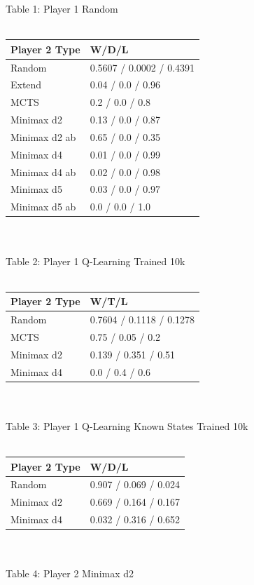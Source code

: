 \documentclass[12pt]{article}
\begin{document}
Table 1: Player 1 Random\\\\
\begin{tabular}{l | l}
Player 2 Type & W/D/L                    \\ \hline
Random        & 0.5607 / 0.0002 / 0.4391 \\
Extend        & 0.04 / 0.0 / 0.96        \\
MCTS          & 0.2 / 0.0 / 0.8          \\
Minimax d2    & 0.13 / 0.0 / 0.87        \\
Minimax d2 ab & 0.65 / 0.0 / 0.35        \\
Minimax d4    & 0.01 / 0.0 / 0.99        \\
Minimax d4 ab & 0.02 / 0.0 / 0.98        \\
Minimax d5    & 0.03 / 0.0 / 0.97        \\
Minimax d5 ab &  0.0 / 0.0 / 1.0     \\                  
\end{tabular}\\\\
Table 2: Player 1 Q-Learning Trained 10k\\\\
\begin{tabular}{l|l}
Player 2 Type               & W/T/L                                     \\ \hline
Random     & 0.7604 / 0.1118 / 0.1278 \\
MCTS                        & 0.75 / 0.05 / 0.2  \\
Minimax d2 & 0.139 / 0.351 / 0.51     \\
Minimax d4 & 0.0 / 0.4 / 0.6
\end{tabular}\\\\
Table 3: Player 1 Q-Learning Known States Trained 10k\\\\
\begin{tabular}{l|l}
Player 2 Type & W/D/L                    \\ \hline
Random        & 0.907 / 0.069 / 0.024 \\
Minimax d2    & 0.669 / 0.164 / 0.167    \\
Minimax d4    &  0.032 / 0.316 / 0.652                       
\end{tabular}\\\\
Table 4: Player 2 Minimax d2\\\\
\end{document}
